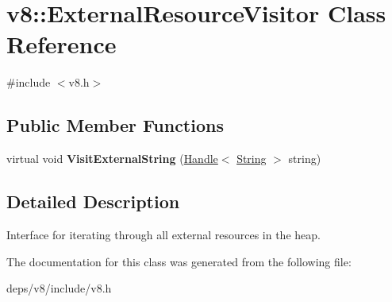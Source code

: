 \hypertarget{classv8_1_1_external_resource_visitor}{}\section{v8\+:\+:External\+Resource\+Visitor Class Reference}
\label{classv8_1_1_external_resource_visitor}


{\ttfamily \#include $<$v8.\+h$>$}

\subsection*{Public Member Functions}
\begin{DoxyCompactItemize}
\item 
\hypertarget{classv8_1_1_external_resource_visitor_ab00ff4cd0d0167894faa8331b68a58c6}{}virtual void {\bfseries Visit\+External\+String} (\hyperlink{classv8_1_1_handle}{Handle}$<$ \hyperlink{classv8_1_1_string}{String} $>$ string)\label{classv8_1_1_external_resource_visitor_ab00ff4cd0d0167894faa8331b68a58c6}

\end{DoxyCompactItemize}


\subsection{Detailed Description}
Interface for iterating through all external resources in the heap. 

The documentation for this class was generated from the following file\+:\begin{DoxyCompactItemize}
\item 
deps/v8/include/v8.\+h\end{DoxyCompactItemize}
